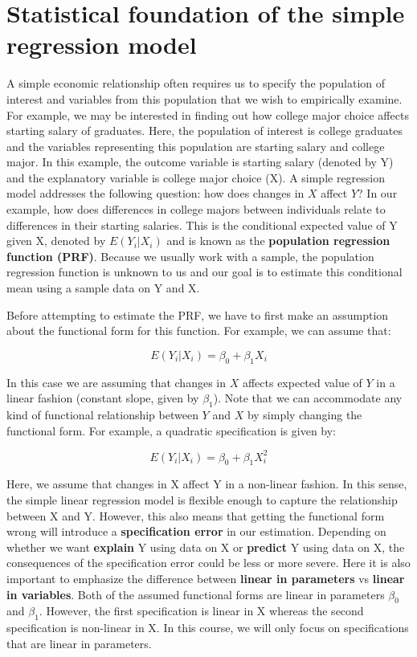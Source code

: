 \documentclass[
]{book}
\theoremstyle{definition}
\theoremstyle{definition}
\theoremstyle{definition}
\theoremstyle{definition}
\theoremstyle{remark}
\begin{document}
\hypertarget{statistical-foundation-of-the-simple-regression-model}{%
\section{Statistical foundation of the simple regression model}\label{statistical-foundation-of-the-simple-regression-model}}

A simple economic relationship often requires us to specify the population of interest and variables from this population that we wish to empirically examine. For example, we may be interested in finding out how college major choice affects starting salary of graduates. Here, the population of interest is college graduates and the variables representing this population are starting salary and college major. In this example, the outcome variable is starting salary (denoted by Y) and the explanatory variable is college major choice (X). A simple regression model addresses the following question: how does changes in \(X\) affect \(Y\)? In our example, how does differences in college majors between individuals relate to differences in their starting salaries. This is the conditional expected value of Y given X, denoted by \(E(Y_i|X_i)\) and is known as the \textbf{population regression function (PRF)}. Because we usually work with a sample, the population regression function is unknown to us and our goal is to estimate this conditional mean using a sample data on Y and X.

Before attempting to estimate the PRF, we have to first make an assumption about the functional form for this function. For example, we can assume that:

\[E(Y_i|X_i)=\beta_0 + \beta_1 X_i\]

In this case we are assuming that changes in \(X\) affects expected value of \(Y\) in a linear fashion (constant slope, given by \(\beta_1\)). Note that we can accommodate any kind of functional relationship between \(Y\) and \(X\) by simply changing the functional form. For example, a quadratic specification is given by:

\[E(Y_i|X_i)=\beta_0 + \beta_1 X_i^2\]

Here, we assume that changes in X affect Y in a non-linear fashion. In this sense, the simple linear regression model is flexible enough to capture the relationship between X and Y. However, this also means that getting the functional form wrong will introduce a \textbf{specification error} in our estimation. Depending on whether we want \textbf{explain} Y using data on X or \textbf{predict} Y using data on X, the consequences of the specification error could be less or more severe. Here it is also important to emphasize the difference between \textbf{linear in parameters} vs \textbf{linear in variables}. Both of the assumed functional forms are linear in parameters \(\beta_0\) and \(\beta_1\). However, the first specification is linear in X whereas the second specification is non-linear in X. In this course, we will only focus on specifications that are linear in parameters.
\end{document}
